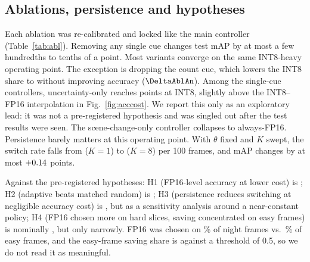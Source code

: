 \documentclass{svproc}
\begin{document}
\subsection{Ablations, persistence and hypotheses}\label{sec:ablations}
Each ablation was re-calibrated and locked like the main controller (Table~\ref{tab:abl}). Removing any single cue changes test mAP
by at most a few hundredths to tenths of a point. Most variants converge on the same INT8-heavy operating point. The exception is dropping the count cue, which lowers the INT8 share to \FracAblAn{} without
improving accuracy ($\DeltaAblAn$). Among the single-cue controllers, uncertainty-only reaches \MapAblSu{} points at
\FracAblSu{} INT8, slightly above the INT8--FP16 interpolation in Fig.~\ref{fig:acccost}. We report this only as an
exploratory lead: it was not a pre-registered hypothesis and was singled out after the test results were seen. The scene-change-only
controller collapses to always-FP16. Persistence barely matters at this operating point. With $\theta$ fixed and $K$ swept,
the switch rate falls from \SwitchRateKOne{} ($K{=}1$) to \SwitchRateKEight{} ($K{=}8$) per 100 frames, and mAP changes by at most
$+0.14$ points.

Against the pre-registered hypotheses: H1 (FP16-level accuracy at lower cost) is \HOneResult; H2 (adaptive beats matched
random) is \HTwoResult; H3 (persistence reduces switching at negligible accuracy cost) is \HThreeResult{}, but as a sensitivity analysis
around a near-constant policy; H4 (FP16 chosen more on hard slices, saving concentrated on easy frames) is nominally
\HFourResult{}, but only narrowly. FP16 was chosen on \PctFPsixteenAdaptiveNight\% of night frames vs.\ \PctFPsixteenAdaptiveEasy\% of easy frames, and the easy-frame
saving share is \HFourEasyShare{} against a threshold of 0.5, so we do not read it as meaningful.
\end{document}

